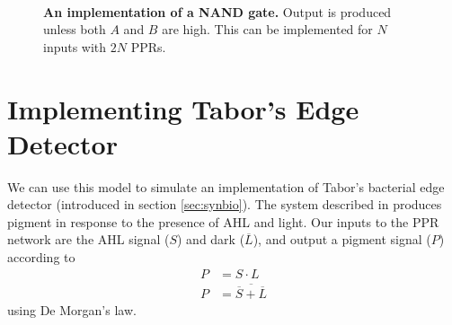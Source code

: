 \begin{figure}
\begin{center}
\begin{subfigure}{0.25\textwidth}
    \end{subfigure}
    ~
    \begin{subfigure}{0.7\textwidth}
      \centering
    \end{subfigure}
  \end{center}
  \caption{\textbf{An implementation of a NAND gate.}
    Output is produced unless both $A$ and $B$ are high.
    This can be implemented for $N$ inputs with $2N$ PPRs.
    \label{fig:nand_simulation}}
\end{figure}

\section{Implementing Tabor's Edge Detector}
\label{sec:sim_tabor}

We can use this model to simulate an implementation of Tabor's bacterial edge 
detector (introduced in section \ref{sec:synbio}).
The system described in \citet{edgeDetector} produces pigment in response to
the presence of AHL and light.
Our inputs to the PPR network are the AHL signal ($S$) and dark
($\overline{L}$), and output a pigment signal ($P$) according to 
\begin{align*}
  P &= S \cdot L \\
  P &= \overline{\overline{S} + \overline{L}}
\end{align*}
using De Morgan's law.

